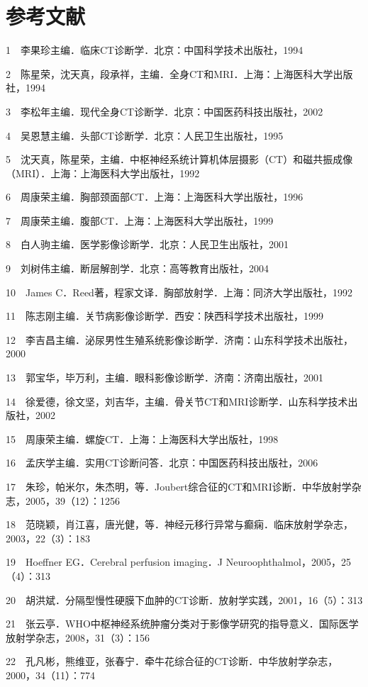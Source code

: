 \chapter{参考文献}

1　李果珍主编．临床CT诊断学．北京：中国科学技术出版社，1994

2　陈星荣，沈天真，段承祥，主编．全身CT和MRI．上海：上海医科大学出版社，1994

3　李松年主编．现代全身CT诊断学．北京：中国医药科技出版社，2002

4　吴恩慧主编．头部CT诊断学．北京：人民卫生出版社，1995

5　沈天真，陈星荣，主编．中枢神经系统计算机体层摄影（CT）和磁共振成像（MRI）．上海：上海医科大学出版社，1992

6　周康荣主编．胸部颈面部CT．上海：上海医科大学出版社，1996

7　周康荣主编．腹部CT．上海：上海医科大学出版社，1999

8　白人驹主编．医学影像诊断学．北京：人民卫生出版社，2001

9　刘树伟主编．断层解剖学．北京：高等教育出版社，2004

10　James C．Reed著，程家文译．胸部放射学．上海：同济大学出版社，1992

11　陈志刚主编．关节病影像诊断学．西安：陕西科学技术出版社，1999

12　李吉昌主编．泌尿男性生殖系统影像诊断学．济南：山东科学技术出版社，2000

13　郭宝华，毕万利，主编．眼科影像诊断学．济南：济南出版社，2001

14　徐爱德，徐文坚，刘吉华，主编．骨关节CT和MRI诊断学．山东科学技术出版社，2002

15　周康荣主编．螺旋CT．上海：上海医科大学出版社，1998

16　孟庆学主编．实用CT诊断问答．北京：中国医药科技出版社，2006

17　朱珍，帕米尔，朱杰明，等．Joubert综合征的CT和MRI诊断．中华放射学杂志，2005，39（12）：1256

18　范晓颖，肖江喜，唐光健，等．神经元移行异常与癫痫．临床放射学杂志，2003，22（3）：183

19　Hoeffner EG．Cerebral perfusion imaging．J
Neuroophthalmol，2005，25（4）：313

20　胡洪斌．分隔型慢性硬膜下血肿的CT诊断．放射学实践，2001，16（5）：313

21　张云亭．WHO中枢神经系统肿瘤分类对于影像学研究的指导意义．国际医学放射学杂志，2008，31（3）：156

22　孔凡彬，熊维亚，张春宁．牵牛花综合征的CT诊断．中华放射学杂志，2000，34（11）：774

